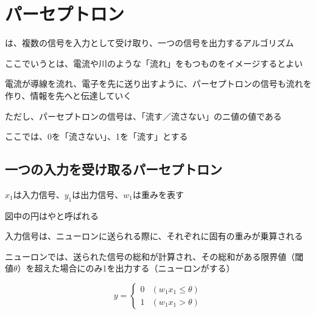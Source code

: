 \documentclass[../../../topic_deep-learning]{subfiles}
\begin{document}
\sectionline
\section{パーセプトロン}

は、複数の信号を入力として受け取り、一つの信号を出力するアルゴリズム

\br

ここでいうとは、電流や川のような「流れ」をもつものをイメージするとよい

電流が導線を流れ、電子を先に送り出すように、パーセプトロンの信号も流れを作り、情報を先へと伝達していく

\br

ただし、パーセプトロンの信号は、「流す／流さない」のニ値の値である

ここでは、0を「流さない」、1を「流す」とする

\subsection{一つの入力を受け取るパーセプトロン}

$x_1$は入力信号、$y_1$は出力信号、$w_1$は重みを表す

図中の円はやと呼ばれる

\begin{center}
\end{center}

入力信号は、ニューロンに送られる際に、それぞれに固有の重みが乗算される

ニューロンでは、送られた信号の総和が計算され、その総和がある限界値（閾値$\theta$）を超えた場合にのみ1を出力する（ニューロンがする）

\begin{equation*}
  y = \begin{cases}
    0 & (w_1 x_1 \leq \theta) \\
    1 & (w_1 x_1 > \theta)
  \end{cases}
\end{equation*}
\end{document}
